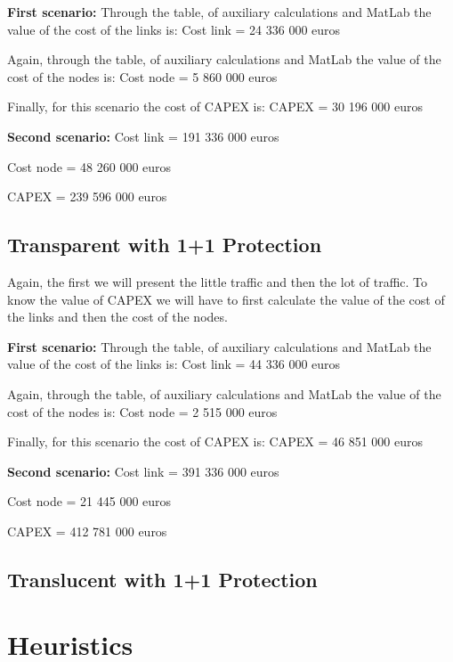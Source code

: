 \textbf{First scenario:}
Through the table, of auxiliary calculations and MatLab the value of the cost of the links is:
Cost link = 24 336 000 euros

Again, through the table, of auxiliary calculations and MatLab the value of the cost of the nodes is:
Cost node = 5 860 000 euros

Finally, for this scenario the cost of CAPEX is:
CAPEX = 30 196 000 euros

\textbf{Second scenario:}
Cost link = 191 336 000 euros

Cost node = 48 260 000 euros

CAPEX = 239 596 000 euros

\subsection{Transparent with 1+1 Protection}
Again, the first we will present the little traffic and then the lot of traffic.
To know the value of CAPEX we will have to first calculate the value of the cost of the links and then the cost of the nodes.

\textbf{First scenario:}
Through the table, of auxiliary calculations and MatLab the value of the cost of the links is:
Cost link = 44 336 000 euros

Again, through the table, of auxiliary calculations and MatLab the value of the cost of the nodes is:
Cost node = 2 515 000 euros

Finally, for this scenario the cost of CAPEX is:
CAPEX = 46 851 000 euros

\textbf{Second scenario:}
Cost link = 391 336 000 euros

Cost node = 21 445 000 euros

CAPEX = 412 781 000 euros

\subsection{Translucent with 1+1 Protection}

\section{Heuristics} 


